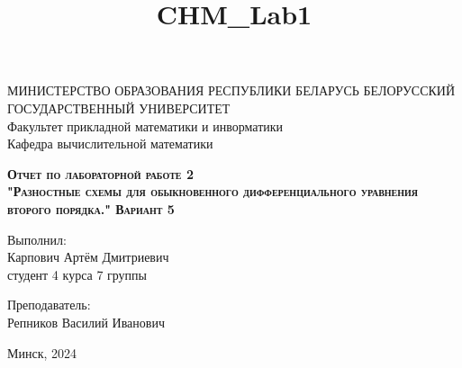 \documentclass[11pt]{article}
\title{CHM\_Lab1}
\begin{document}
    
    \begin{titlepage}
    \newpage
    
    \begin{center}
    МИНИСТЕРСТВО ОБРАЗОВАНИЯ РЕСПУБЛИКИ БЕЛАРУСЬ БЕЛОРУССКИЙ ГОСУДАРСТВЕННЫЙ УНИВЕРСИТЕТ \\
    Факультет прикладной математики и инворматики \\ Кафедра вычислительной математики
 
    \end{center}
    
    \vspace{8em}
    
    \vspace{2em}
    
    \begin{center}
    \textsc{\textbf{Отчет по лабораторной работе 2 \\ "Разностные схемы для обыкновенного дифференциального уравнения второго порядка." \linebreak Вариант 5}}
    \end{center}
    
    \vspace{6em}
    
    \begin{flushright}
        Выполнил:\\
        Карпович Артём Дмитриевич\\
        студент 4 курса 7 группы
    \end{flushright}
    
    \begin{flushright}
        Преподаватель:\\
        Репников Василий Иванович
    \end{flushright}
    
    \vspace{\fill}
    
    \vspace{\fill}
    
    \begin{center}
    Минск, 2024
    \end{center}
    
    \end{titlepage}
    
\end{document}
